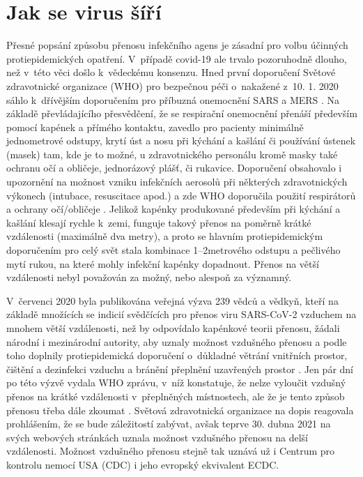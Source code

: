 \section*{Jak se virus šíří}
Přesné popsání způsobu přenosu infekčního agens je zásadní pro volbu účinných protiepidemických opatření. V~případě covid-19 ale trvalo pozoruhodně dlouho, než v~této věci došlo k~vědeckému konsenzu. Hned první doporučení Světové zdravotnické organizace (WHO) pro bezpečnou péči o~nakažené z~10. 1. 2020 sáhlo k~dřívějším doporučením pro příbuzná onemocnění SARS a MERS \cite{WHO:2014}. Na základě převládajícího přesvědčení, že se respirační onemocnění přenáší především pomocí kapének a přímého kontaktu, zavedlo pro pacienty minimálně jednometrové odstupy, krytí úst a nosu při kýchání a kašlání či používání ústenek (masek) tam, kde je to možné, u zdravotnického personálu kromě masky také ochranu očí a obličeje, jednorázový plášť, či rukavice. Doporučení obsahovalo i upozornění na možnost vzniku infekčních aerosolů při některých zdravotnických výkonech (intubace, resuscitace apod.) a zde WHO doporučila použití respirátorů a ochrany očí/obličeje \cite{WHO:2020b}. Jelikož kapénky produkované především při kýchání a kašlání klesají rychle k~zemi, funguje takový přenos na poměrně krátké vzdálenosti (maximálně dva metry), a proto se hlavním protiepidemickým doporučením pro celý svět stala kombinace 1--2metrového odstupu a pečlivého mytí rukou, na které mohly infekční kapénky dopadnout. Přenos na větší vzdálenosti nebyl považován za možný, nebo alespoň za významný.

V~červenci 2020 byla publikována veřejná výzva 239 vědců a vědkyň, kteří na základě množících se indicií svědčících pro přenos viru SARS-CoV-2 vzduchem na mnohem větší vzdálenosti, než by odpovídalo kapénkové teorii přenosu, žádali národní i mezinárodní autority, aby uznaly možnost vzdušného přenosu a podle toho doplnily protiepidemická doporučení o~důkladné větrání vnitřních prostor, čištění a dezinfekci vzduchu a bránění přeplnění uzavřených prostor \cite{Morawska:2020}. Jen pár dní po této výzvě vydala WHO zprávu, v~níž konstatuje, že nelze vyloučit vzdušný přenos na krátké vzdálenosti v~přeplněných místnostech, ale že je tento způsob přenosu třeba dále zkoumat \cite{WHO:2020c}. Světová zdravotnická organizace na dopis reagovala prohlášením, že se bude záležitostí zabývat, avšak teprve 30. dubna 2021 na svých webových stránkách uznala možnost vzdušného přenosu na delší vzdálenosti. Možnost vzdušného přenosu stejně tak uznává už i Centrum pro kontrolu nemocí USA (CDC) i jeho evropský ekvivalent ECDC.

